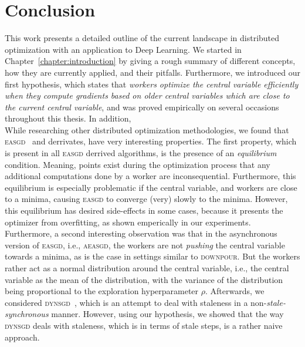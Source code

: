 %
%
%

\chapter{Conclusion}
\label{chapter:conclusion}

This work presents a detailed outline of the current landscape in distributed optimization with an application to Deep Learning. We started in Chapter~\ref{chapter:introduction} by giving a rough summary of different concepts, how they are currently applied, and their pitfalls. Furthermore, we introduced our first hypothesis, which states that \emph{workers optimize the central variable efficiently when they compute gradients based on older central variables which are close to the current central variable}, and was proved empirically on several occasions throughout this thesis. In addition,\\

While researching other distributed optimization methodologies, we found that \textsc{easgd}~\cite{zhang2015deep} and derrivates, have very interesting properties. The first property, which is present in all \textsc{easgd} derrived algorithms, is the presence of an \emph{equilibrium} condition. Meaning, points exist during the optimization process that any additional computations done by a worker are inconsequential. Furthermore, this equilibrium is especially problematic if the central variable, and workers are close to a minima, causing \textsc{easgd} to converge (very) slowly to the minima. However, this equilibrium has desired side-effects in some cases, because it presents the optimizer from overfitting, as shown emperically in our experiments. Furthermore, a second interesting observation was that in the asynchronous version of \textsc{easgd}, i.e., \textsc{aeasgd}, the workers are not \emph{pushing} the central variable towards a minima, as is the case in settings similar to \textsc{downpour}. But the workers rather act as a normal distribution around the central variable, i.e., the central variable as the mean of the distribution, with the variance of the distribution being proportional to the exploration hyperparameter $\rho$. Afterwards, we considered \textsc{dynsgd}~\cite{jiang2017heterogeneity}, which is an attempt to deal with staleness in a non-\emph{stale-synchronous} manner. However, using our hypothesis, we showed that the way \textsc{dynsgd} deals with staleness, which is in terms of stale steps, is a rather naive approach.\\

